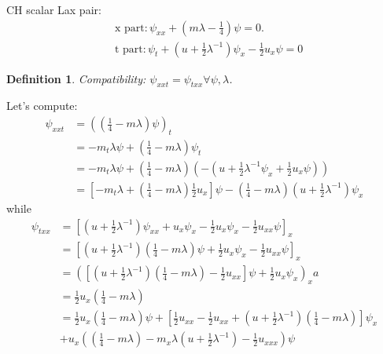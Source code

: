 \documentclass[12pt,reqno]{amsart}
\numberwithin{equation}{section}  %
\newtheorem{definition}[theorem]{Definition}
\begin{document}
  CH scalar Lax pair:
%
%
  \begin{equation*}
    \begin{split}
      & \text{x part}: \psi_{xx} + (m \lambda - \frac{1}{4}) \psi = 0.
      \\
      & \text{t part}: \psi_{t} + (u + \frac{1}{2} \lambda^{-1})\psi_{x} -
      \frac{1}{2}u_{x} \psi = 0
    \end{split}
  \end{equation*}
%
%
  \begin{definition}
    Compatibility: $\psi_{xxt} = \psi_{txx} \forall \psi, \lambda$. 
  \end{definition}
  Let's compute:
%
%
  \begin{equation*}
    \begin{split}
      \psi_{xxt}
      & = \left( (\frac{1}{4} - m \lambda)\psi \right)_{t}
      \\
      & = -m_{t} \lambda \psi + \left( \frac{1}{4} - m \lambda \right)
      \psi_{t}
      \\
      & = -m_{t} \lambda \psi + \left( \frac{1}{4} - m \lambda \right)\left(
      -(u + \frac{1}{2} \lambda^{-1}\psi_{x} + \frac{1}{2} u_{x} \psi)
      \right)
      \\
      & = \left[ -m_{t} \lambda + (\frac{1}{4}- m \lambda)\frac{1}{2}u_{x} \right]\psi
      - (\frac{1}{4} - m \lambda)(u + \frac{1}{2}\lambda^{-1})\psi_{x}
    \end{split}
  \end{equation*}
%
%
  while
%
%
  \begin{equation*}
    \begin{split}
      \psi_{txx}
      & = \left[ (u + \frac{1}{2} \lambda^{-1})\psi_{xx} + u_{x}
	\psi_{x} - \frac{1}{2} u_{x} \psi_{x} - \frac{1}{2} u_{xx} \psi
      \right]_{x}
      \\
      & = \left[ (u + \frac{1}{2}\lambda^{-1})(\frac{1}{4} - m \lambda)\psi
      + \frac{1}{2} u_{x} \psi_{x} - \frac{1}{2} u_{xx} \psi \right]_{x}
      \\
      & = \left( \left[ (u + \frac{1}{2} \lambda^{-1})(\frac{1}{4} - m \lambda) -
      \frac{1}{2} u_{xx} \right]\psi + \frac{1}{2} u_{x} \psi_{x} \right)_{x}a
      \\
      & = \frac{1}{2} u_{x}(\frac{1}{4} - m \lambda)
      \\
      & = \frac{1}{2}u_{x}\left( \frac{1}{4} - m \lambda \right)\psi + \left[
	\frac{1}{2}u_{xx} - \frac{1}{2} u_{xx} + (u +
	\frac{1}{2}\lambda^{-1})(\frac{1}{4} - m \lambda)
      \right]\psi_{x}
      \\
      & + u_{x}\left( (\frac{1}{4} - m \lambda) - m_{x} \lambda (u +
      \frac{1}{2} \lambda^{-1}) - \frac{1}{2} u_{xxx}\right)\psi
    \end{split}
  \end{equation*}
\end{document}
